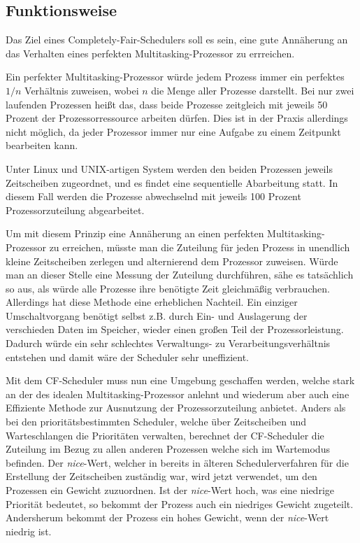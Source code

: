 \subsection{Funktionsweise}\label{s:cfs_fktweise}
Das Ziel eines  Completely-Fair-Schedulers{} soll es sein, eine gute Annäherung an das Verhalten eines perfekten Multitasking-Prozessor zu errreichen.

Ein perfekter Multi\-tasking-Prozessor würde jedem Prozess immer ein perfektes $1/n$ Verhältnis zuweisen, wobei $n$ die Menge aller Prozesse darstellt. 
Bei nur zwei laufenden Prozessen heißt das, dass beide Prozesse zeitgleich mit jeweils 50 Prozent der Prozessorressource arbeiten dürfen. Dies ist in der Praxis allerdings nicht möglich, da jeder Prozessor immer nur eine Aufgabe zu einem Zeitpunkt bearbeiten kann.

Unter Linux und UNIX-artigen System werden den beiden Prozessen jeweils Zeitscheiben zugeordnet, und es findet eine sequentielle Abarbeitung statt. In diesem Fall werden die Prozesse abwechselnd mit jeweils 100 Prozent Prozessorzuteilung abgearbeitet.

Um mit diesem Prinzip eine Annäherung an einen perfekten Multitasking-Prozessor zu erreichen, müsste man die Zuteilung für jeden Prozess in unendlich kleine Zeitscheiben zerlegen und alternierend dem Prozessor zuweisen. Würde man an dieser Stelle eine Messung der Zuteilung durchführen, sähe es tatsächlich so aus, als würde alle Prozesse ihre benötigte Zeit gleichmäßig verbrauchen.
Allerdings hat diese Methode eine erheblichen Nachteil. Ein einziger Umschalt\-vorgang be\-nötigt selbst z.B. durch Ein- und Auslagerung der verschieden Daten im Speicher, wieder einen großen Teil der Prozessorleistung. Dadurch würde ein sehr schlechtes Verwaltungs- zu Verarbeitungsverhältnis entstehen und damit wäre der Scheduler sehr uneffizient.

Mit dem CF-Scheduler muss nun eine Umgebung geschaffen werden, welche stark an der des idealen Multitasking-Prozessor anlehnt und wiederum aber auch eine Effiziente Methode zur Ausnutzung der Prozessorzuteilung anbietet.
Anders als bei den prioritätsbestimmten Scheduler, welche über Zeitscheiben und Warteschlangen die Prioritäten verwalten, berechnet der CF-Scheduler die Zuteilung im Bezug zu allen anderen Prozessen welche sich im Wartemodus befinden. Der  \textit{nice}-Wert, welcher in bereits in älteren Scheduler\-ver\-fahren für die Erstellung der Zeitscheiben zuständig war, wird jetzt verwendet, um den Prozessen ein Gewicht zuzuordnen. Ist der  \textit{nice}-Wert hoch, was eine niedrige Priorität bedeutet, so bekommt der Prozess auch ein niedriges Gewicht zugeteilt. Andersherum bekommt der Prozess ein hohes Gewicht, wenn der  \textit{nice}-Wert niedrig ist.

